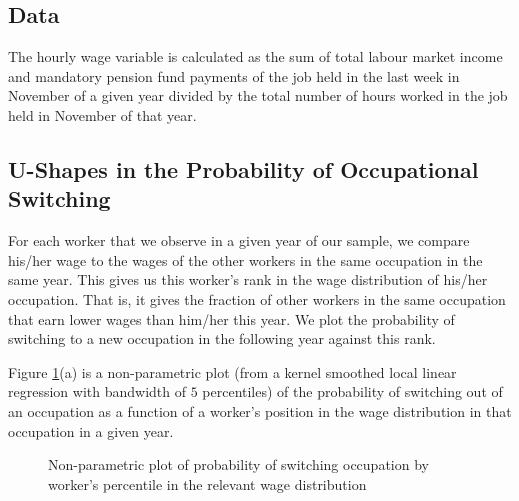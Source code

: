 \documentclass[12pt]{article}
\theoremstyle{definition}
\begin{document}
\subsection{Data}

{The hourly wage variable is calculated as the sum of total labour market income and mandatory pension fund payments of the job held in the last week in November of a given year divided by the total number of hours worked in the job held in November of that year.} 

\subsection{U-Shapes in the Probability of Occupational Switching}

For each worker that we observe in a given year of our sample, we compare his/her wage to the wages of the other workers in the same occupation in the same year. This gives us this worker's rank in the wage distribution of his/her occupation. That is, it gives the fraction of other workers in the same occupation that earn lower wages than him/her this year. We plot the probability of switching to a new occupation in the following year against this rank. 

Figure \ref{groesUShapesOccupationalMobility2015_fig1}(a) is a non-parametric plot (from a kernel smoothed local linear regression with bandwidth of $5$ percentiles) of the probability of switching out of an occupation as a function of a worker's position in the wage distribution in that occupation in a given year.

\begin{figure}[H]
    \noindent\caption{Non-parametric plot of probability of switching occupation by worker's percentile in the relevant wage distribution}
    \begin{center}
        \label{groesUShapesOccupationalMobility2015_fig1}
    \end{center}
\end{figure}
\end{document}
